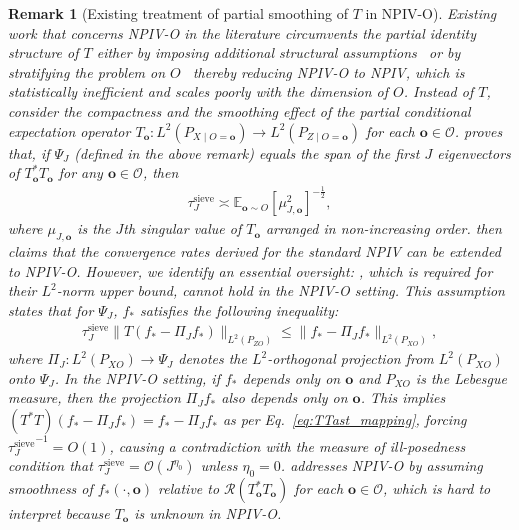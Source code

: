 \documentclass[11pt]{article}
\newcommand{\bo}{\mathbf o}
\newcommand{\calO}{\mathcal{O}}
\newcommand{\0}{\mathbf{0}}
\newtheorem{rem}{Remark}[section]
\begin{document}
\begin{rem}[Existing treatment of partial smoothing of $T$ in NPIV-O]\label{rem:partial_smoothing}
Existing work that concerns NPIV-O in the literature circumvents the partial identity structure of $T$ either by imposing additional structural assumptions~\citep{blundell2007semi, syrgkanis2019machine} or by stratifying the problem on $O$~\citep{horowitz2011applied} thereby reducing NPIV-O to NPIV, which is statistically inefficient and scales poorly with the dimension of $O$. 
Instead of $T$, \citet[Section 3.3]{Chen_2018} consider the compactness and the smoothing effect of the \emph{partial} conditional expectation operator $T_{\bo}: L^2(P_{X\mid O = \bo})\to L^2(P_{Z\mid O=\bo})$ for each $\bo\in \calO $. \citet[Section 3.3]{Chen_2018} proves that, if $\Psi_J$ (defined in the above remark) equals the span of the first $J$ eigenvectors of $T_{\bo}^\ast T_{\bo}$ for any $\bo\in\calO$, then
\begin{align}
\label{eq:chen_smoip_observed}
    \tau_J^{\mathrm{sieve}} \asymp \mathbb{E}_{\bo\sim O}[\mu_{J, \bo}^2]^{-\frac{1}{2}},
\end{align}
where $\mu_{J,\bo}$ is the $J$th singular value of $T_{\bo}$ arranged in non-increasing order. \citet{Chen_2018} then claims that the convergence rates derived for the standard NPIV can be extended to NPIV-O. However, we identify an essential oversight: \citet[Assumption 4 (ii)]{Chen_2018}, which is required for their $L^2$-norm upper bound, cannot hold in the NPIV-O setting. This assumption states that for $\Psi_J$, $f_{\ast}$ satisfies the following inequality:
\begin{align*}
    \tau_J^{\mathrm{sieve}}\|T(f_{\ast} - \Pi_J f_{\ast})\|_{L^2(P_{ZO})}\leq \|f_{\ast} - \Pi_{J}f_{\ast}\|_{L^2(P_{XO})},
\end{align*}
where $\Pi_J: L^2(P_{XO})\to \Psi_J$ denotes the $L^2$-orthogonal projection from $L^2(P_{XO})$ onto $\Psi_J$. 
In the NPIV-O setting, if $f_{\ast}$ depends only on $\bo$ and $P_{XO}$ is the Lebesgue measure, then the projection $\Pi_J f_{\ast}$ also depends only on $\bo$. 
This implies $(T^\ast T)(f_{\ast} - \Pi_J f_{\ast}) = f_{\ast} - \Pi_J f_{\ast}$ as per Eq.~\eqref{eq:TTast_mapping}, forcing ${\tau_J^{\mathrm{sieve}}}^{-1} = O(1)$, causing a contradiction with the measure of ill-posedness condition that $\tau_J^{\mathrm{sieve}} = \calO(J^{\eta_0})$ unless $\eta_0 = 0$. 
\citet{HallHorowitz2005} addresses NPIV-O by assuming smoothness of $f_\ast(\cdot, \bo)$ relative to $\mathcal{R}(T_\bo^\ast T_\bo)$ for each $\bo\in\calO$, which is hard to interpret because $T_\bo$ is
unknown in NPIV-O.
\end{rem}
\end{document}
